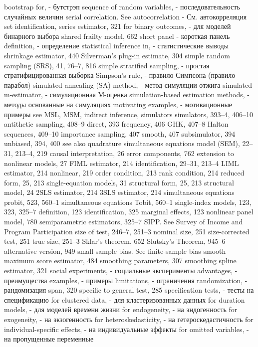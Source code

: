 bootstrap for, - бутстрэп
sequence of random variables, - последовательность случайных величин
serial correlation. See autocorrelation - См. автокорреляция
set identification, 
series estimator, 321
for binary outcomes, - для моделей бинарного выбора
shared frailty model, 662 
short panel - короткая панель
definition, - определение
statistical inference in, - статистические выводы 
shrinkage estimator, 440
Silverman’s plug-in estimate, 304
simple random sampling (SRS), 41, 76–7, 816
simple stratified sampling, - простая стратифицированная выборка
Simpson’s rule, - правило Симпсона (правило парабол)
simulated annealing (SA) method, - метод симуляции отжига
simulated m-estimator, - симуляционная М-оценка
simulation-based estimation methods, - методы основанные на симуляциях
motivating examples, - мотивационные примеры
see MSL, MSM, indirect inference, simulators simulators, 393–4, 406–10
antithetic sampling, 408–9 
direct, 393
frequency, 406
GHK, 407–8
Halton sequences, 409–10 importance sampling, 407 smooth, 407 subsimulator, 394 unbiased, 394, 400
see also quadrature
simultaneous equations model (SEM), 22–31, 213–4,
219
causal interpretation, 26
error components, 762
extension to nonlinear models, 27 FIML estimator, 214
identification, 29–31, 213–4 LIML estimator, 214 nonlinear, 219
order condition, 213
rank condition, 214 reduced form, 25, 213 single-equation models, 31 structural form, 25, 213 structural model, 24
2SLS estimator, 214
3SLS estimator, 214
simultaneous equations probit, 523, 560–1 simultaneous equations Tobit, 560–1 single-index models, 123, 323, 325–7
definition, 123
identification, 325
marginal effects, 123
nonlinear panel model, 780 semiparametric estimators, 325–7
SIPP. See Survey of Income and Program Participation size of test, 246–7, 251–3
nominal size, 251 size-corrected test, 251 true size, 251–3
Sklar’s theorem, 652 Slutsky’s Theorem, 945–6 alternative version, 949
small-sample bias. See finite-sample bias smooth maximum score estimator, 484 
smoothing parameters, 307
smoothing spline estimator, 321
social experiments, - социальные эксперименты
advantages, - преимущества
examples, - примеры
limitations, - ограничения
randomization, - рандомизация
span, 320
specific to general test, 285 
specification tests, - тесты на спецификацию
for clustered data, - для кластеризованных данных
for duration models, - для моделей времени жизни
for endogeneity, - на эндогенность
for exogeneity, - на экзогенность
for heteroskedasticity, - на гетероскедастичность
for individual-specific effects, - на индивидуальные эффекты
for omitted variables, - на пропущенные переменные
